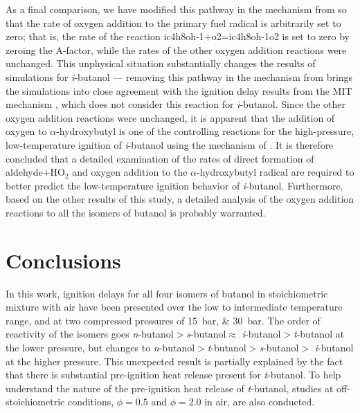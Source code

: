 \documentclass[12pt, letterpaper]{article}
\begin{document}
As a final comparison, we have modified this pathway in the mechanism from
\textcite{Sarathy2012} so that the rate of oxygen addition to the primary
fuel radical is arbitrarily set to zero; that is, the rate of the reaction
ic4h8oh-1+o2=ic4h8oh-1o2 is set to zero by zeroing the $\mathrm{A}$-factor, while the
rates of the other oxygen addition reactions were unchanged. This unphysical
situation substantially changes the results of simulations for
\textit{i}-butanol --- removing this pathway in the mechanism from
\textcite{Sarathy2012} brings the simulations into close agreement with the
ignition delay results from the MIT mechanism \cite{Hansen2013,Merchant2013},
which does not consider this reaction for \textit{i}-butanol. Since the other
oxygen addition reactions were unchanged, it is apparent that the addition of
oxygen to $\alpha$-hydroxybutyl is one of the controlling reactions for the
high-pressure, low-temperature ignition of \textit{i}-butanol using the
mechanism of \textcite{Sarathy2012}. It is therefore concluded that a detailed
examination of the rates of direct formation of aldehyde+HO$_2$ and oxygen
addition to the $\alpha$-hydroxybutyl radical are required to better predict
the low-temperature ignition behavior of \textit{i}-butanol. Furthermore, based
on the other results of this study, a detailed analysis of the oxygen addition
reactions to all the isomers of butanol is probably warranted.

\section{Conclusions}
\label{sec:buoh-conclusions}

In this work, ignition delays for all four isomers of butanol in stoichiometric
mixture with air have been presented over the low to intermediate temperature
range, and at two compressed pressures of \SIlist{15;30}{\bar}. The order of
reactivity of the isomers goes \textit{n}-butanol$>$\textit{s}-butanol$\approx$
\textit{i}-butanol$>$\textit{t}-butanol at the lower pressure, but changes to
\textit{n}-butanol$>$\textit{t}-butanol$>$\textit{s}-butanol$>$
\textit{i}-butanol at the higher pressure. This unexpected result is partially
explained by the fact that there is substantial pre-ignition heat release
present for \textit{t}-butanol. To help understand the nature of the
pre-ignition heat release of \textit{t}-butanol, studies at off-stoichiometric
conditions, $\phi=\num{0.5}$ and $\phi=\num{2.0}$ in air, are also conducted.
\end{document}
